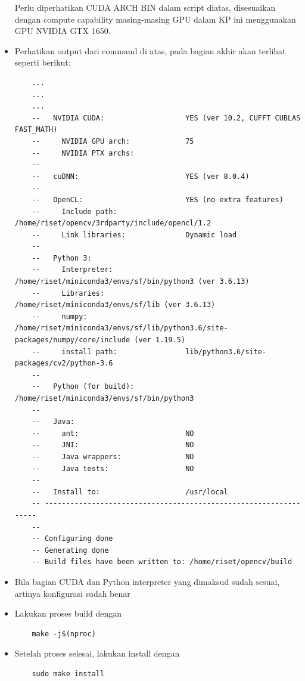 \begin{itemize}
  Perlu diperhatikan CUDA ARCH BIN dalam script diatas, disesuaikan dengan compute capability masing-masing GPU dalam KP ini menggunakan GPU NVIDIA GTX 1650.

  \item Perhatikan output dari command di atas, pada bagian akhir akan terlihat seperti berikut:
  
  \begin{lstlisting}
    ...
    ...
    ...
    --   NVIDIA CUDA:                   YES (ver 10.2, CUFFT CUBLAS FAST_MATH)
    --     NVIDIA GPU arch:             75
    --     NVIDIA PTX archs:
    -- 
    --   cuDNN:                         YES (ver 8.0.4)
    -- 
    --   OpenCL:                        YES (no extra features)
    --     Include path:                /home/riset/opencv/3rdparty/include/opencl/1.2
    --     Link libraries:              Dynamic load
    -- 
    --   Python 3:
    --     Interpreter:                 /home/riset/miniconda3/envs/sf/bin/python3 (ver 3.6.13)
    --     Libraries:                   /home/riset/miniconda3/envs/sf/lib (ver 3.6.13)
    --     numpy:                       /home/riset/miniconda3/envs/sf/lib/python3.6/site-packages/numpy/core/include (ver 1.19.5)
    --     install path:                lib/python3.6/site-packages/cv2/python-3.6
    -- 
    --   Python (for build):            /home/riset/miniconda3/envs/sf/bin/python3
    -- 
    --   Java:                          
    --     ant:                         NO
    --     JNI:                         NO
    --     Java wrappers:               NO
    --     Java tests:                  NO
    -- 
    --   Install to:                    /usr/local
    -- -----------------------------------------------------------------
    -- 
    -- Configuring done
    -- Generating done
    -- Build files have been written to: /home/riset/opencv/build
  \end{lstlisting}

  \item Bila bagian CUDA dan Python interpreter yang dimaksud sudah sesuai, artinya konfigurasi sudah benar
  \item Lakukan proses build dengan
  
  \begin{lstlisting}
    make -j$(nproc)
  \end{lstlisting}

  \item Setelah proses selesai, lakukan install dengan
  
  \begin{lstlisting}
    sudo make install
  \end{lstlisting}


\end{itemize}
